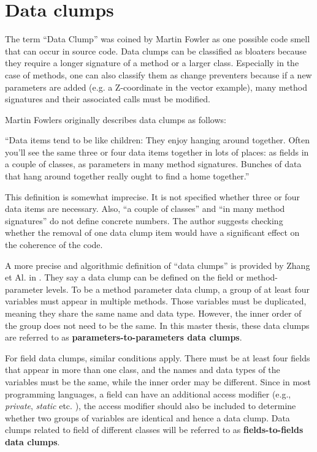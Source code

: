 \section{Data clumps}\label{sec:data_clump_def}
The term \enquote{Data Clump} was coined by Martin Fowler as one possible code smell that can occur in source code. 
Data clumps can be classified as bloaters because they require a longer signature of a method or a larger class. Especially in the case of methods, one can also classify them as change preventers because if a new parameters are added (e.g. a Z-coordinate in the vector example), many method signatures and their associated calls must be modified. 

Martin Fowlers originally describes data clumps as follows:

\begin{displayquote}
\enquote{Data items tend to be like children: They enjoy hanging around together. Often you'll see
the same three or four data items together in lots of
places: as fields in a couple of classes, as parameters in many
method signatures. Bunches of data that hang around together really ought to find a home together.} \cite{fowler2019refactoring} 
\end{displayquote}


This definition is somewhat imprecise. It is not specified whether three or four data items are necessary. Also, \enquote{a couple of classes} and \enquote{in many method signatures} do not define concrete numbers. The author suggests checking whether the removal of one data clump item would have a significant effect on the coherence of the code.

A more precise and algorithmic definition of \enquote{data clumps} is provided by Zhang et Al. in  \cite{zhangImprovingPrecisionFowler2008}. They say a data clump can be defined on the field or method-parameter levels. 
To be a method parameter data clump, a group of at least four variables must appear in multiple methods. Those variables must be duplicated, meaning they share the same name and data type. However, the inner order of the group does not need to be the same. In this master thesis, these data clumps are referred to as \textbf{parameters-to-parameters data clumps}.

For field data clumps, similar conditions apply. There must be at least four fields that appear in more than one class, and the names and data types of the variables must be the same, while the inner order may be different. Since in most programming languages, a field can have an additional access modifier (e.g., \textit{private}, \textit{static} etc. ), the access modifier should also be included to determine whether two groups of variables are identical and hence a data clump.  Data clumps related to field of different classes will be referred to as \textbf{fields-to-fields data clumps}.

